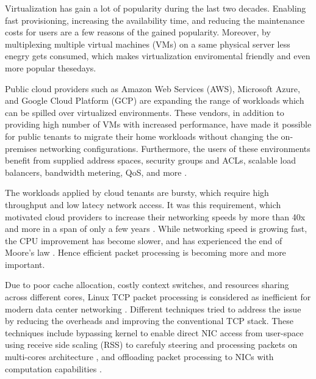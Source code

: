 
Virtualization has gain a lot of popularity during the last two decades. Enabling fast 
provisioning, increasing the availability time, and reducing the maintenance costs
for users are a few reasons of the gained popularity. Moreover, by multiplexing 
multiple virtual machines (VMs) on a same physical server less enegry gets consumed, 
which makes virtualization enviromental friendly and even more popular thesedays.

Public cloud providers such as Amazon Web Services (AWS), Microsoft Azure, and Google Cloud
Platform (GCP) are expanding the range of workloads which can be spilled over virtualized environments. 
These  vendors, in addition to providing high number of VMs with increased performance, have made 
it possible for public tenants to migrate their home workloads without changing the 
on-premises networking configurations. Furthermore, the users of these environments
benefit from supplied address spaces, security groups and ACLs, scalable load balancers, 
bandwidth metering, QoS, and more \cite{firestone2017vfp}.


The workloads applied by cloud tenants are bursty, which require high throughput and low latecy 
network access. It was this requirement, which motivated cloud providers to increase their networking 
speeds by more than 40x and more in a span of only a few years \cite{firestone2018azure}. While 
networking speed is growing fast, the CPU improvement has become slower, and has experienced the 
end of Moore's law \cite{esmaeilzadeh2011dark}. Hence efficient packet processing is becoming 
more and more important. 

Due to poor cache allocation, costly context switches, and resources sharing across different 
cores, Linux TCP packet processing is considered as inefficient for modern data center 
networking \cite{kaufmann2019tas, shashidhara2022flextoe}. Different techniques tried 
to address the issue by reducing the overheads and improving the conventional TCP stack.
These techniques include bypassing kernel to enable direct NIC access from user-space
\cite{belay2014ix, jeong2014mtcp, prekas2017zygos}
using receive side scaling (RSS) to carefuly steering and processing packets on multi-cores 
architecture \cite{marty2019snap, kaufmann2019tas}, and offloading packet processing to 
NICs with computation capabilities 
\cite{arashloo2020enabling, lin2020panic, firestone2018azure, shashidhara2022flextoe}. 



